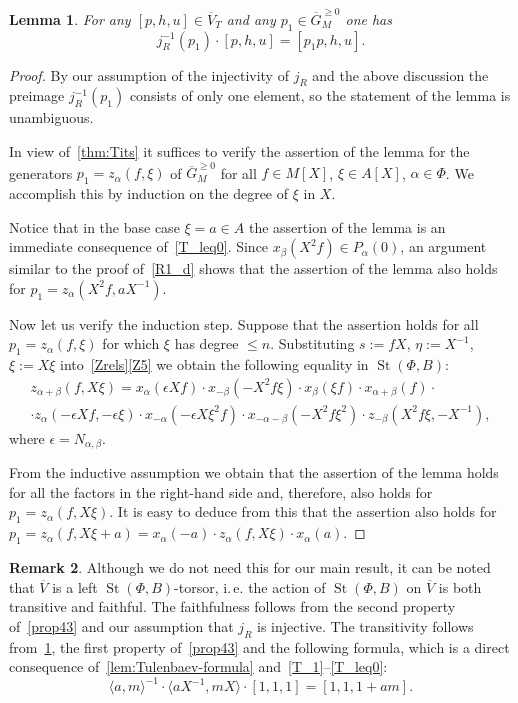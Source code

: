 \documentclass[oneside, 8pt]{amsart}
\newtheorem{lemma}{Lemma}
\theoremstyle{remark}
\theoremstyle{definition}
\numberwithin{lemma}{section}
\numberwithin{prop}{section}
\numberwithin{corollary}{section}
\numberwithin{externaltheorem}{section}
\newtheorem{rem}[lemma]{Remark}
\DeclareMathOperator{\St}{St}
\numberwithin{equation}{section}
\begin{document}
\begin{lemma}\label{lem:action} For any $[p, h, u]\in \overline{V}_T$ and any $p_1 \in \overline{G}^{\geq 0}_M$ one has 
\[j_R^{-1}(p_1) \cdot [p, h, u] = [p_1p, h, u].\] \end{lemma}
\begin{proof} 
By our assumption of the injectivity of $j_R$ and the above discussion the preimage $j_R^{-1}(p_1)$ consists of only one element, so the statement of the lemma is unambiguous.

In view of~\cref{thm:Tits} it suffices to verify the assertion of the lemma for the generators $p_1 = z_\alpha(f, \xi)$ of $\overline{G}_M^{\geq 0}$ for all $f \in M[X]$, $\xi\in A[X]$, $\alpha \in \Phi$. We accomplish this by induction on the degree of $\xi$ in $X$. 

Notice that in the base case $\xi = a \in A$ the assertion of the lemma is an immediate consequence of~\eqref{T_leq0}.
Since $x_\beta(X^2f) \in P_\alpha(0)$, an argument similar to the proof of~\cref{R1_d} shows that the assertion of the lemma also holds for $p_1 = z_\alpha(X^2f, aX^{-1})$.

Now let us verify the induction step.
Suppose that the assertion holds for all $p_1 = z_\alpha(f, \xi)$ for which $\xi$ has degree $\leq n$.
Substituting $s := fX$, $\eta := X^{-1}$, $\xi := X\xi$ into~\cref{Zrels}\ref{Z5} we obtain the following equality in $\St(\Phi, B)$:
\begin{multline*}
 z_{\alpha+\beta}(f, X\xi) = x_\alpha(\epsilon Xf) \cdot x_{-\beta}(-X^2 f\xi ) \cdot x_{\beta}(\xi f) \cdot x_{\alpha+\beta}(f) \cdot \\ \cdot z_\alpha(-\epsilon Xf, -\epsilon \xi) \cdot x_{-\alpha}(-\epsilon X\xi^2f) \cdot x_{-\alpha-\beta}(- X^2f \xi^2) \cdot z_{-\beta}(X^2f\xi, -X^{-1}), \end{multline*}
where $\epsilon = N_{\alpha, \beta}$.

From the inductive assumption we obtain that the assertion of the lemma holds for all the factors in the right-hand side and, therefore, also holds for $p_1 = z_\alpha(f, X\xi)$. It is easy to deduce from this that the assertion also holds for $p_1 = z_\alpha(f, X\xi + a) = x_\alpha(-a) \cdot z_\alpha(f, X\xi) \cdot x_\alpha(a)$. 
\end{proof}

\begin{rem} Although we do not need this for our main result, it can be noted that $\overline{V}$ is a left $\St(\Phi, B)$-torsor, i.\,e. the action of $\St(\Phi, B)$ on $\overline{V}$ is both transitive and faithful. The faithfulness follows from the second property of~\cref{prop43} and our assumption that $j_R$ is injective. The transitivity follows from~\cref{lem:action}, the first property of~\cref{prop43} and the following formula, which is a direct consequence of~\cref{lem:Tulenbaev-formula} and~\eqref{T_1}--\eqref{T_leq0}:
\begin{equation*} \langle a, m \rangle^{-1} \cdot \langle aX^{-1}, mX \rangle \cdot [1, 1, 1] = [1, 1, 1+am]. \end{equation*} \end{rem}
\end{document}
